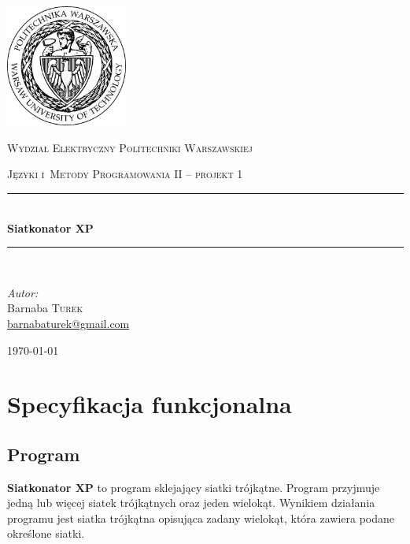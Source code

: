 \documentclass[a4paper]{article}
\newcommand{\HRule}{\rule{\linewidth}{0.5mm}}
\newcommand{\siatkonator}{\textbf{Siatkonator XP} }
\begin{document}
\begin{titlepage}

  \begin{center}


    \includegraphics[width=0.3\textwidth]{logo.jpg}\\[1cm]

    \begin{onehalfspace}
      \textsc{\LARGE Wydział Elektryczny Politechniki Warszawskiej}\\[1.5cm]
    \end{onehalfspace}



    \textsc{Języki i~Metody Programowania II -- projekt 1}\\[0.5cm]

    \HRule \\[0.4cm]
    {\huge \bfseries Siatkonator XP }\\[0.2cm]
    \HRule \\[1.5cm]

    \begin{flushleft} \large
      \emph{Autor:}\\
      Barnaba \textsc{Turek}\\
      \href{mailto:barnabaturek@gmail.com}{barnabaturek@gmail.com}
    \end{flushleft}
    \vfill

    {\large \today}

  \end{center}

\end{titlepage}
\sloppy

\setcounter{tocdepth}{4}
\tableofcontents

\section{Specyfikacja funkcjonalna}
\subsection{Program}
\siatkonator to program sklejający siatki trójkątne.
Program przyjmuje jedną lub więcej siatek trójkątnych oraz jeden wielokąt.
Wynikiem działania programu jest siatka trójkątna opisująca zadany wielokąt, która zawiera podane określone siatki.
\end{document}
